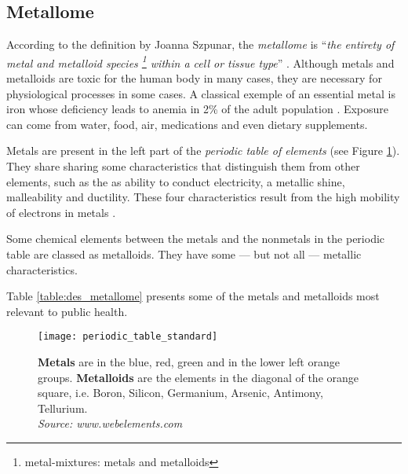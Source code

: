 \subsection{Metallome}
According to the definition by Joanna Szpunar, the \emph{metallome} is ``\emph{the entirety of metal and metalloid species \footnote{metal-mixtures: metals and metalloids} within a cell or tissue type}'' \cite{szpunar_advances_2005}. Although metals and metalloids are toxic for the human body in many cases, they are necessary for physiological processes in some cases. A classical exemple of an essential metal is iron whose deficiency leads to anemia in 2\% of the adult population \cite{iron_anemia}. Exposure can come from water, food, air, medications and even dietary supplements.

Metals are present in the left part of the \emph{periodic table of elements} (see Figure \ref{fig:periodic_table}). They share sharing some characteristics that distinguish them from other elements, such as the as ability to conduct electricity, a metallic shine, malleability and ductility. These four characteristics result from the high mobility of electrons in metals \cite{atkins_chimie:_2007}.

Some chemical elements between the metals and the nonmetals in the periodic table are classed as metalloids. They have some --- but not all --- metallic characteristics.

Table \ref{table:des_metallome} presents some of the metals and metalloids most relevant to public health.

\begin{figure}
\centering
\captionsetup{singlelinecheck = false, format= hang, justification=raggedright, font=small, labelsep=space}
\texttt{[image: periodic\_table\_standard]}
  \label{fig:periodic_table}
\begin{flushleft}
{\footnotesize \textbf{Metals} are in the blue, red, green and in the lower left orange groups. \textbf{Metalloids} are the elements in the diagonal of the orange square, i.e. Boron, Silicon, Germanium, Arsenic, Antimony, Tellurium. \\
\emph{Source: www.webelements.com}}
\end{flushleft}
\end{figure}

